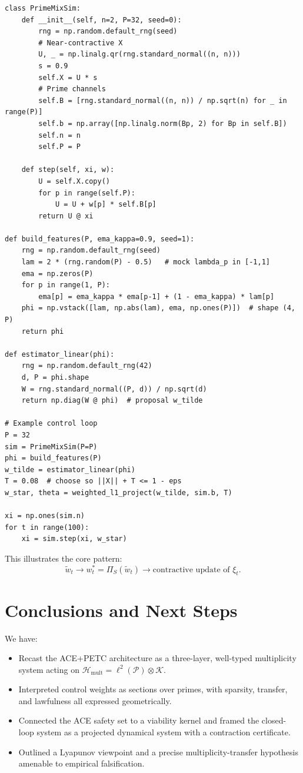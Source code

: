 \documentclass[11pt]{article}
\begin{document}
\begin{verbatim}
class PrimeMixSim:
    def __init__(self, n=2, P=32, seed=0):
        rng = np.random.default_rng(seed)
        # Near-contractive X
        U, _ = np.linalg.qr(rng.standard_normal((n, n)))
        s = 0.9
        self.X = U * s
        # Prime channels
        self.B = [rng.standard_normal((n, n)) / np.sqrt(n) for _ in range(P)]
        self.b = np.array([np.linalg.norm(Bp, 2) for Bp in self.B])
        self.n = n
        self.P = P

    def step(self, xi, w):
        U = self.X.copy()
        for p in range(self.P):
            U = U + w[p] * self.B[p]
        return U @ xi

def build_features(P, ema_kappa=0.9, seed=1):
    rng = np.random.default_rng(seed)
    lam = 2 * (rng.random(P) - 0.5)   # mock lambda_p in [-1,1]
    ema = np.zeros(P)
    for p in range(1, P):
        ema[p] = ema_kappa * ema[p-1] + (1 - ema_kappa) * lam[p]
    phi = np.vstack([lam, np.abs(lam), ema, np.ones(P)])  # shape (4, P)
    return phi

def estimator_linear(phi):
    rng = np.random.default_rng(42)
    d, P = phi.shape
    W = rng.standard_normal((P, d)) / np.sqrt(d)
    return np.diag(W @ phi)  # proposal w_tilde

# Example control loop
P = 32
sim = PrimeMixSim(P=P)
phi = build_features(P)
w_tilde = estimator_linear(phi)
T = 0.08  # choose so ||X|| + T <= 1 - eps
w_star, theta = weighted_l1_project(w_tilde, sim.b, T)

xi = np.ones(sim.n)
for t in range(100):
    xi = sim.step(xi, w_star)
\end{verbatim}

This illustrates the core pattern:
\[
\tilde w_t \to w_t^\ast = \Pi_S(\tilde w_t) \to \text{contractive update of }\xi_t.
\]

\section{Conclusions and Next Steps}

We have:
\begin{itemize}
  \item Recast the ACE+PETC architecture as a three-layer, well-typed multiplicity system acting on $\mathcal H_{\mathrm{mult}} = \ell^2(\mathcal P)\otimes\mathcal K$.
  \item Interpreted control weights as sections over primes, with sparsity, transfer, and lawfulness all expressed geometrically.
  \item Connected the ACE safety set to a viability kernel and framed the closed-loop system as a projected dynamical system with a contraction certificate.
  \item Outlined a Lyapunov viewpoint and a precise multiplicity-transfer hypothesis amenable to empirical falsification.
\end{itemize}
\end{document}
